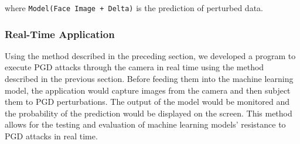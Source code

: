 where \verb|Model(Face Image + Delta)| is the prediction of perturbed data.

\subsubsection{Real-Time Application}

Using the method described in the preceding section, we developed a program to execute PGD attacks through the camera in real time using the method described in the previous section. Before feeding them into the machine learning model, the application would capture images from the camera and then subject them to PGD perturbations. The output of the model would be monitored and the probability of the prediction would be displayed on the screen. This method allows for the testing and evaluation of machine learning models' resistance to PGD attacks in real time.


